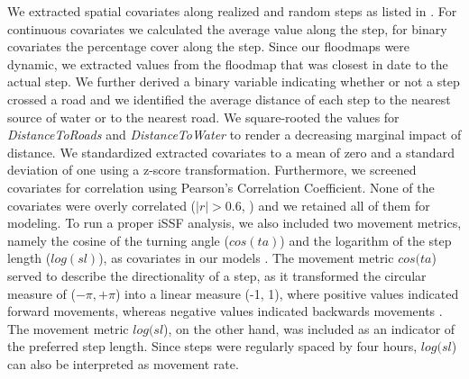 \documentclass[abstract=on,10pt,a4paper,bibliography=totocnumbered]{scrartcl}
\begin{document}
We extracted spatial covariates along realized and random steps as listed in
. For continuous covariates we calculated the average
value along the step, for binary covariates the percentage cover along the step.
Since our floodmaps were dynamic, we extracted values from the floodmap that was
closest in date to the actual step. We further derived a binary variable
indicating whether or not a step crossed a road and we identified the average
distance of each step to the nearest source of water or to the nearest road. We
square-rooted the values for \textit{DistanceToRoads} and
\textit{DistanceToWater} to render a decreasing marginal impact of distance. We
standardized extracted covariates to a mean of zero and a standard deviation of
one using a z-score transformation. Furthermore, we screened covariates for
correlation using Pearson's Correlation Coefficient. None of the covariates were
overly correlated (\(|r| > 0.6\), \cite{Latham.2011}) and we retained all of
them for modeling. To run a proper iSSF analysis, we also included two movement
metrics, namely the cosine of the turning angle (\(cos(ta)\)) and the logarithm
of the step length (\(log(sl)\)), as covariates in our models
\citep{Avgar.2016}. The movement metric \(cos(ta\)) served to describe the
directionality of a step, as it transformed the circular measure of (\(-\pi,
+\pi\)) into a linear measure (-1, 1), where positive values indicated forward
movements, whereas negative values indicated backwards movements
\citep{Turchin.1998}. The movement metric \(log(sl\)), on the other hand, was
included as an indicator of the preferred step length. Since steps were
regularly spaced by four hours, \(log(sl\)) can also be interpreted as movement
rate.
\end{document}
